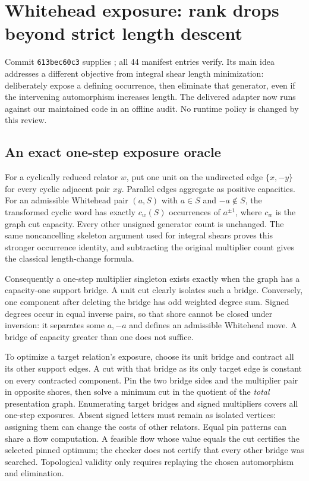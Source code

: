 \section{Whitehead exposure: rank drops beyond strict length descent}
\label{sec:whitehead-exposure-review}

Commit \texttt{613bec60c3} supplies
; all 44 manifest
entries verify. Its main idea addresses a different objective from integral
shear length minimization: deliberately expose a defining occurrence, then
eliminate that generator, even if the intervening automorphism increases
length. The delivered adapter now runs against our maintained code in an
offline audit. No runtime policy is changed by this review.

\subsection{An exact one-step exposure oracle}

For a cyclically reduced relator $w$, put one unit on the undirected edge
$\{x,-y\}$ for every cyclic adjacent pair $xy$. Parallel edges aggregate
as positive capacities. For an admissible Whitehead pair $(a,S)$ with
$a\in S$ and $-a\notin S$, the transformed cyclic word has exactly
$c_w(S)$ occurrences of $a^{\pm1}$, where $c_w$ is the graph cut capacity.
Every other unsigned generator count is unchanged. The same noncancelling
skeleton argument used for integral shears proves this stronger occurrence
identity, and subtracting the original multiplier count gives the classical
length-change formula.

Consequently a one-step multiplier singleton exists exactly when the graph
has a capacity-one support bridge. A unit cut clearly isolates such a bridge.
Conversely, one component after deleting the bridge has odd weighted degree
sum. Signed degrees occur in equal inverse pairs, so that shore cannot be
closed under inversion: it separates some $a,-a$ and defines an admissible
Whitehead move. A bridge of capacity greater than one does not suffice.

To optimize a target relation's exposure, choose its unit bridge and contract
all its other support edges. A cut with that bridge as its only target edge
is constant on every contracted component. Pin the two bridge sides and the
multiplier pair in opposite shores, then solve a minimum cut in the quotient
of the \emph{total} presentation graph. Enumerating target bridges and signed
multipliers covers all one-step exposures. Absent signed letters must remain
as isolated vertices: assigning them can change the costs of other relators.
Equal pin patterns can share a flow computation. A feasible flow whose value
equals the cut certifies the selected pinned optimum; the checker does not
certify that every other bridge was searched. Topological validity only
requires replaying the chosen automorphism and elimination.

